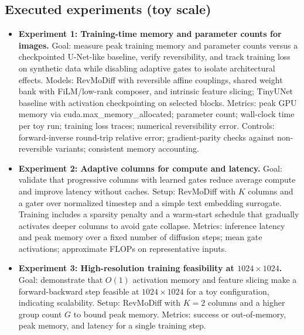 \documentclass{article}
\begin{document}
\subsection{Executed experiments (toy scale)}
\begin{itemize}
\item \textbf{Experiment 1: Training-time memory and parameter counts for images.} Goal: measure peak training memory and parameter counts versus a checkpointed U-Net-like baseline, verify reversibility, and track training loss on synthetic data while disabling adaptive gates to isolate architectural effects. Models: RevMoDiff with reversible affine couplings, shared weight bank with FiLM/low-rank composer, and intrinsic feature slicing; TinyUNet baseline with activation checkpointing on selected blocks. Metrics: peak GPU memory via cuda.max\_memory\_allocated; parameter count; wall-clock time per toy run; training loss traces; numerical reversibility error. Controls: forward-inverse round-trip relative error; gradient-parity checks against non-reversible variants; consistent memory accounting.
\item \textbf{Experiment 2: Adaptive columns for compute and latency.} Goal: validate that progressive columns with learned gates reduce average compute and improve latency without caches. Setup: RevMoDiff with $K$ columns and a gater over normalized timestep and a simple text embedding surrogate. Training includes a sparsity penalty and a warm-start schedule that gradually activates deeper columns to avoid gate collapse. Metrics: inference latency and peak memory over a fixed number of diffusion steps; mean gate activations; approximate FLOPs on representative inputs.
\item \textbf{Experiment 3: High-resolution training feasibility at $1024\times 1024$.} Goal: demonstrate that $O(1)$ activation memory and feature slicing make a forward-backward step feasible at $1024\times 1024$ for a toy configuration, indicating scalability. Setup: RevMoDiff with $K = 2$ columns and a higher group count $G$ to bound peak memory. Metrics: success or out-of-memory, peak memory, and latency for a single training step.
\end{itemize}
\end{document}
